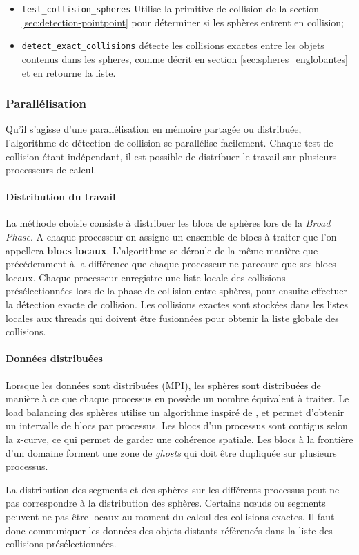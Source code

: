 \documentclass[11pt,class=article,float=false,crop=false]{standalone}
\begin{document}
\begin{itemize}
	\item \texttt{test\_collision\_spheres} Utilise la primitive de collision de la section \ref{sec:detection-pointpoint} pour déterminer si les sphères entrent en collision;
	\item \texttt{detect\_exact\_collisions} détecte les collisions exactes entre les objets contenus dans les spheres, comme décrit en section \ref{sec:spheres_englobantes} et en retourne la liste.
\end{itemize}


\subsubsection{Parallélisation}
\label{sec:parallelisation_detection}
Qu'il s'agisse d'une parallélisation en mémoire partagée ou distribuée, l'algorithme de détection de collision se parallélise facilement. Chaque test de collision étant indépendant, il est possible de distribuer le travail sur plusieurs processeurs de calcul. 

\paragraph{Distribution du travail}
La méthode choisie consiste à distribuer les blocs de sphères lors de la \textit{Broad Phase}. A chaque processeur on assigne un ensemble de blocs à traiter que l'on appellera \textbf{blocs locaux}. L'algorithme se déroule de la même manière que précédemment à la différence que chaque processeur ne parcoure que ses blocs locaux. Chaque processeur enregistre une liste locale des collisions présélectionnées lors de la phase de collision entre sphères, pour ensuite effectuer la détection exacte de collision. Les collisions exactes sont stockées dans les listes locales aux threads qui doivent être fusionnées pour obtenir la liste globale des collisions.

\paragraph{Données distribuées}
Lorsque les données sont distribuées (MPI), les sphères sont distribuées de manière à ce que chaque processus en possède un nombre équivalent à traiter. Le load balancing des sphères utilise un algorithme inspiré de , et permet d'obtenir un intervalle de blocs par processus. Les blocs d'un processus sont contigus selon la z-curve, ce qui permet de garder une cohérence spatiale. Les blocs à la frontière d'un domaine forment une zone de \textit{ghosts} qui doit être dupliquée sur plusieurs processus.

La distribution des segments et des sphères sur les différents processus peut ne pas correspondre à la distribution des sphères. Certains nœuds ou segments peuvent ne pas être locaux au moment du calcul des collisions exactes. Il faut donc communiquer les données des objets distants référencés dans la liste des collisions présélectionnées.
\end{document}
